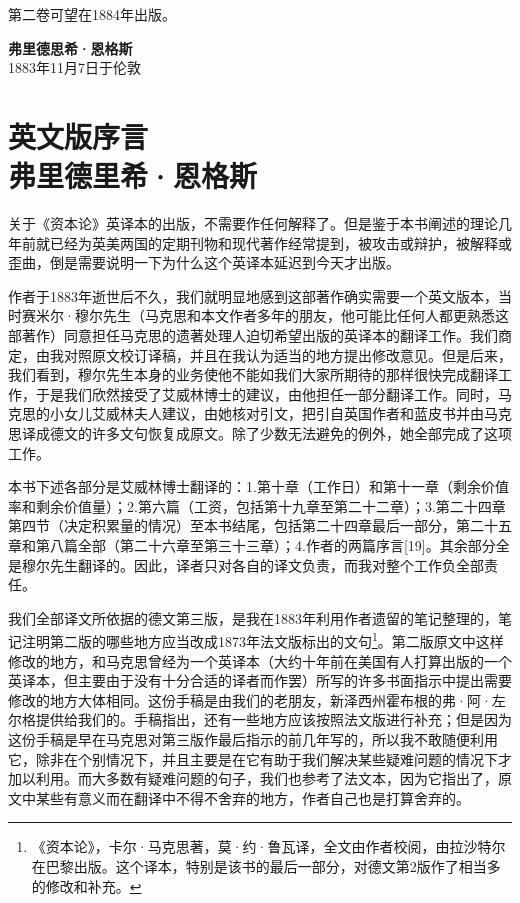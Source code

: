 \documentclass{ctexbook}
\begin{document}
第二卷可望在1884年出版。

\begin{flushright}
    \textbf{弗里德思希·恩格斯}\\
    \small{1883年11月7日于伦敦}
\end{flushright}

\chapter[弗里德里希·恩格斯\hspace{1em}英文版序言]{英文版序言\\{\small 弗里德里希·恩格斯}}

关于《资本论》英译本的出版，不需要作任何解释了。但是鉴于本书阐述的理论几年前就已经为英美两国的定期刊物和现代著作经常提到，被攻击或辩护，被解释或歪曲，倒是需要说明一下为什么这个英译本延迟到今天才出版。

作者于1883年逝世后不久，我们就明显地感到这部著作确实需要一个英文版本，当时赛米尔·穆尔先生（马克思和本文作者多年的朋友，他可能比任何人都更熟悉这部著作）同意担任马克思的遗著处理人迫切希望出版的英译本的翻译工作。我们商定，由我对照原文校订译稿，并且在我认为适当的地方提出修改意见。但是后来，我们看到，穆尔先生本身的业务使他不能如我们大家所期待的那样很快完成翻译工作，于是我们欣然接受了艾威林博士的建议，由他担任一部分翻译工作。同时，马克思的小女儿艾威林夫人建议，由她核对引文，把引自英国作者和蓝皮书并由马克思译成德文的许多文句恢复成原文。除了少数无法避免的例外，她全部完成了这项工作。

本书下述各部分是艾威林博士翻译的：1.第十章（工作日）和第十一章（剩余价值率和剩余价值量）；2.第六篇（工资，包括第十九章至第二十二章）；3.第二十四章第四节（决定积累量的情况）至本书结尾，包括第二十四章最后一部分，第二十五章和第八篇全部（第二十六章至第三十三章）；4.作者的两篇序言[19]。其余部分全是穆尔先生翻译的。因此，译者只对各自的译文负责，而我对整个工作负全部责任。

我们全部译文所依据的德文第三版，是我在1883年利用作者遗留的笔记整理的，笔记注明第二版的哪些地方应当改成1873年法文版标出的文句\footnote{《资本论》，卡尔·马克思著，莫·约·鲁瓦译，全文由作者校阅，由拉沙特尔在巴黎出版。这个译本，特别是该书的最后一部分，对德文第2版作了相当多的修改和补充。}。第二版原文中这样修改的地方，和马克思曾经为一个英译本（大约十年前在美国有人打算出版的一个英译本，但主要由于没有十分合适的译者而作罢）所写的许多书面指示中提出需要修改的地方大体相同。这份手稿是由我们的老朋友，新泽西州霍布根的弗·阿·左尔格提供给我们的。手稿指出，还有一些地方应该按照法文版进行补充；但是因为这份手稿是早在马克思对第三版作最后指示的前几年写的，所以我不敢随便利用它，除非在个别情况下，并且主要是在它有助于我们解决某些疑难问题的情况下才加以利用。而大多数有疑难问题的句子，我们也参考了法文本，因为它指出了，原文中某些有意义而在翻译中不得不舍弃的地方，作者自己也是打算舍弃的。
\end{document}
